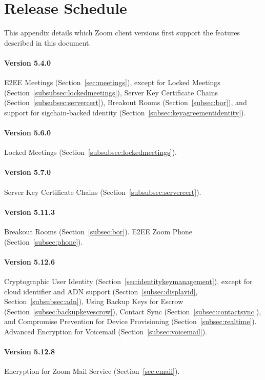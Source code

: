 \section{Release Schedule}
\label{appendix:releases}
This appendix details which Zoom client versions first support the features described in this
document.

\paragraph{Version 5.4.0}
E2EE Meetings (Section~\ref{sec:meetings}), except for Locked Meetings
(Section~\ref{subsubsec:lockedmeetings}), Server Key Certificate Chains
(Section~\ref{subsubsec:servercert}), Breakout Rooms (Section~\ref{subsec:bor}), and support for
sigchain-backed identity (Section~\ref{subsec:keyagreementidentity}).

\paragraph{Version 5.6.0}
Locked Meetings (Section~\ref{subsubsec:lockedmeetings}).

\paragraph{Version 5.7.0}
Server Key Certificate Chains (Section~\ref{subsubsec:servercert}).

\paragraph{Version 5.11.3}
Breakout Rooms (Section~\ref{subsec:bor}). E2EE Zoom Phone (Section~\ref{subsec:phone}).

\paragraph{Version 5.12.6}
Cryptographic User Identity (Section~\ref{sec:identitykeymanagement}), except for cloud identifier
and ADN support (Section~\ref{subsec:displayid}, Section~\ref{subsubsec:adn}), Using Backup Keys for
Escrow (Section~\ref{subsec:backupkeyescrow}), Contact Sync (Section~\ref{subsec:contactsync}), and
Compromise Prevention for Device Provisioning (Section~\ref{subsec:realtime}). Advanced Encryption
for Voicemail (Section~\ref{subsec:voicemail}).

\paragraph{Version 5.12.8}
Encryption for Zoom Mail Service (Section~\ref{sec:email}).
